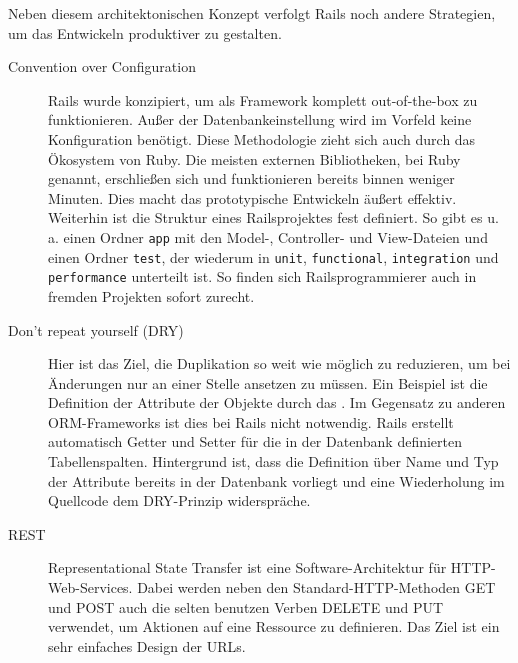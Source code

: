 Neben diesem architektonischen Konzept verfolgt Rails noch andere Strategien, um das Entwickeln produktiver zu gestalten.
\begin{description}
 \item[Convention over Configuration] Rails wurde konzipiert, um als Framework komplett out-of-the-box zu funktionieren. Außer der Datenbankeinstellung wird im Vorfeld keine Konfiguration benötigt. Diese Methodologie zieht sich auch durch das Ökosystem von Ruby. Die meisten externen Bibliotheken, bei Ruby  genannt, erschließen sich und funktionieren bereits binnen weniger Minuten. Dies macht das prototypische Entwickeln äußert effektiv. Weiterhin ist die Struktur eines Railsprojektes fest definiert. So gibt es u. a. einen Ordner \texttt{app} mit den Model-, Controller- und View-Dateien und einen Ordner \texttt{test}, der wiederum in \texttt{unit}, \texttt{functional}, \texttt{integration} und \texttt{performance} unterteilt ist. So finden sich Railsprogrammierer auch in fremden Projekten sofort zurecht.
 \item[Don't repeat yourself (DRY)] Hier ist das Ziel, die Duplikation so weit wie möglich zu reduzieren, um bei Änderungen nur an einer Stelle ansetzen zu müssen. Ein Beispiel ist die Definition der Attribute der Objekte durch das . Im Gegensatz zu anderen ORM-Frameworks ist dies bei Rails nicht notwendig. Rails erstellt automatisch Getter und Setter für die in der Datenbank definierten Tabellenspalten. Hintergrund ist, dass die Definition über Name und Typ der Attribute bereits in der Datenbank vorliegt und eine Wiederholung im Quellcode dem DRY-Prinzip widerspräche.
 \item[REST] Representational State Transfer ist eine Software-Architektur für HTTP-Web\hyp{}Services. Dabei werden neben den Standard-HTTP-Methoden GET und POST auch die selten benutzen Verben DELETE und PUT verwendet, um Aktionen auf eine Ressource zu definieren. Das Ziel ist ein sehr einfaches Design der URLs.


\end{description}

